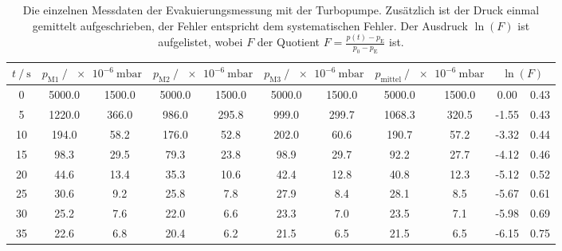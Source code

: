   \begin{table}[h]
    \centering
    \caption{Die einzelnen Messdaten der Evakuierungsmessung mit der Turbopumpe. 
    Zusätzlich ist der Druck einmal gemittelt aufgeschrieben, der Fehler entspricht dem systematischen Fehler. 
    Der Ausdruck $\ln(F)$ ist aufgelistet, wobei $F$ der Quotient $F = \frac{p(t) - p_\text{E}}{p_0 - p_\text{E}}$ ist. }
    \label{tab:turbo_eva}
    \begin{tabular}{ S[table-format=3.0] S @{${}\pm{}$} S S @{${}\pm{}$} S  S @{${}\pm{}$} S S @{${}\pm{}$} S S[table-format=2.2] @{${}\pm{}$} S[table-format=1.2]}
      \toprule
      {$t \mathbin{/} \si{\second}$} &  &  &  &  &  \\
       & 5000.0 & 1500.0 & 5000.0 & 1500.0 & 5000.0 & 1500.0 & 5000.0 & 1500.0 &  0.00 & 0.43 \\
        5 & 1220.0 &  366.0 &  986.0 &  295.8 &  999.0 &  299.7 & 1068.3 &  320.5 & -1.55 & 0.43 \\
       10 &  194.0 &   58.2 &  176.0 &   52.8 &  202.0 &   60.6 &  190.7 &   57.2 & -3.32 & 0.44 \\
       15 &   98.3 &   29.5 &   79.3 &   23.8 &   98.9 &   29.7 &   92.2 &   27.7 & -4.12 & 0.46 \\
       20 &   44.6 &   13.4 &   35.3 &   10.6 &   42.4 &   12.8 &   40.8 &   12.3 & -5.12 & 0.52 \\
       25 &   30.6 &    9.2 &   25.8 &    7.8 &   27.9 &    8.4 &   28.1 &    8.5 & -5.67 & 0.61 \\
       30 &   25.2 &    7.6 &   22.0 &    6.6 &   23.3 &    7.0 &   23.5 &    7.1 & -5.98 & 0.69 \\
       35 &   22.6 &    6.8 &   20.4 &    6.2 &   21.5 &    6.5 &   21.5 &    6.5 & -6.15 & 0.75 \\

\end{tabular}
\end{table}
